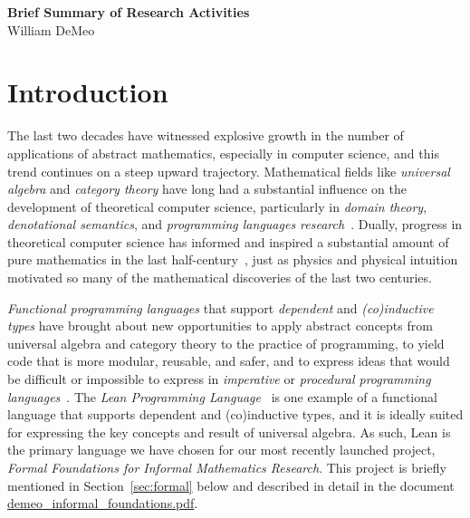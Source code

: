 \begin{center}
  {\bf Brief Summary of Research Activities}\\[4pt]
  William DeMeo
\end{center}


\vskip5mm

\section{Introduction}
The last two decades have witnessed explosive growth in the number of applications of abstract mathematics, especially in computer science, and this trend continues on a steep upward trajectory. Mathematical fields like \emph{universal algebra} and \emph{category theory} have long had a substantial influence on the development of theoretical computer science, particularly in \emph{domain theory}, \emph{denotational semantics}, and \emph{programming languages research}~\cite{MR2328298,MR1249550}. Dually, progress in theoretical computer science has informed and inspired a substantial amount of pure mathematics in the last half-century~\cite{MR3662915,MR3725758,MR2765040,MR3233442,MR1321662,MR1249550}, just as physics and physical intuition motivated so many of the mathematical discoveries of the last two centuries.  

\emph{Functional programming languages} that support \emph{dependent} and \emph{(co)inductive types} have brought about new opportunities to apply abstract concepts from universal algebra and category theory to the practice of programming, to yield code that is more modular, reusable, and safer, and to express ideas that would be difficult or impossible to express in \emph{imperative} or \emph{procedural programming languages}~\cite[Chs. 5 \& 10]{baueroplss:2018,hughes:1989,chiusano:2014}. 
The \emph{Lean Programming Language}~\cite{lean} is one example of a functional language that supports dependent and (co)inductive types, and it is ideally suited for expressing the key concepts and result of universal algebra.  As such, Lean is the primary language we have chosen for our most recently launched project, \emph{Formal Foundations for Informal Mathematics Research}.  This project is briefly mentioned in Section~\ref{sec:formal} below and described in detail in the document 
\href{https://github.com/williamdemeo/job-app/blob/master/research/demeo_informal_foundations.pdf}{demeo\_informal\_foundations.pdf}.

